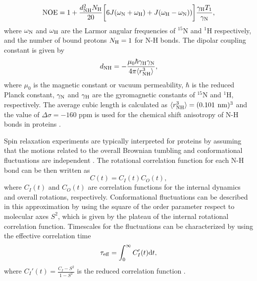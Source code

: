 \documentclass[journal=jpcbfk,manuscript=article]{achemso}
\begin{document}
\begin{equation}\label{NOE}
  {\rm NOE}=1+\frac{d_{\rm{NH}}^2N_{\rm{H}}}{20}\bigg[6J(\omega_{\rm{N}}+\omega_{\rm{H}})+J(\omega_{\rm{H}}-\omega_{\rm{N}}))\bigg]\frac{\gamma_{\rm{H}}T_1}{\gamma_{\rm{N}}},
\end{equation}
where $\omega_{\rm{N}}$ and $\omega_{\rm{H}}$ are the Larmor angular
frequencies of $^{15}$N and $^1$H respectively, and
the number of bound protons $N_{\rm{H}}=1$ for N-H bonds.
The dipolar coupling constant is given by
\begin{equation}
d_{\rm{NH}}=-\frac{\mu_0\hbar\gamma_{\rm{H}}\gamma_{\rm{N}}}{4\pi\langle r_{\rm{NH}}^3\rangle},\nonumber
\end{equation}
where $\mu_0$ is the magnetic constant or vacuum permeability, $\hbar$ is the reduced Planck constant,
$\gamma_{\rm{N}}$ and $\gamma_{\rm{H}}$ are the gyromagnetic constants of $^{15}$N and $^1$H, respectively.
The average cubic length is calculated as $\langle r_{\rm{NH}}^3\rangle = (0.101$ ${\rm nm})^3$ and the 
value of $\Delta \sigma = -160$ ppm is used for the chemical shift anisotropy of N-H bonds in 
proteins \cite{kay89,hiyama88}.

Spin relaxation experiments are typically interpreted for proteins by
assuming that the motions related to the overall Brownian tumbling 
and conformational fluctuations are independent \cite{halle09}.
The rotational correlation function for each N-H bond can be then written
as  \cite{wennerstrom79,Lipari82,jarymowycz06,korzhnev01,halle09}
\begin{equation}\label{CORRFsep}
  C(t)=C_I(t)C_O(t),
\end{equation}
where $C_I(t)$ and $C_O(t)$ are correlation functions for the internal dynamics and overall
rotations, respectively. Conformational fluctuations can be described
in this approximation by using the square of the order parameter respect to 
molecular axes $S^2$, which is given by the plateau of the internal rotational 
correlation function. Timescales for the fluctuations can be characterized by
using the effective correlation time 
\begin{equation}\label{effCT}
  \tau_{\rm eff}=\int_0^\infty C_I'(t) \mathrm{d}t,
\end{equation}
where $C_I'(t)=\frac{C_I-S^2}{1-S^2}$ is the reduced correlation function \cite{Lipari82}.
\end{document}
